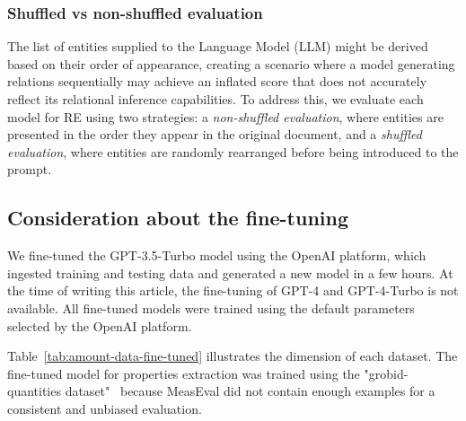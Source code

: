 \subsubsection{Shuffled vs non-shuffled evaluation}
\label{subsub:shuffled-non_shuffled-eval}
The list of entities supplied to the Language Model (LLM) might be derived based on their order of appearance, creating a scenario where a model generating relations sequentially may achieve an inflated score that does not accurately reflect its relational inference capabilities. 
To address this, we evaluate each model for RE using two strategies: a \emph{non-shuffled evaluation}, where entities are presented in the order they appear in the original document, and a \emph{shuffled evaluation}, where entities are randomly rearranged before being introduced to the prompt.

\subsection{Consideration about the fine-tuning}
\label{subsec:consideration-fine-tuning}

We fine-tuned the GPT-3.5-Turbo model using the OpenAI platform, which ingested training and testing data and generated a new model in a few hours. 
At the time of writing this article, the fine-tuning of GPT-4 and GPT-4-Turbo is not available. 
All fine-tuned models were trained using the default parameters selected by the OpenAI platform.

Table~\ref{tab:amount-data-fine-tuned} illustrates the dimension of each dataset. 
The fine-tuned model for properties extraction was trained using the "grobid-quantities dataset"~\cite{foppiano2019quantities} because MeasEval did not contain enough examples for a consistent and unbiased evaluation. 


